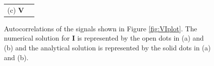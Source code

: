 {\begin{center}
\begin{figure}[h]
\begin{center}
\begin{tabular}{cc}
(c) $\mathbf{V}$
\end{tabular}
\end{center}
\caption[Autocorrelations of the signals]{Autocorrelations of the signals shown in Figure \ref{fig:VIplot}.  The numerical solution for $\mathbf{I}$ is represented by the open dots in (a) and (b) and the analytical solution is represented by the solid dots in (a) and (b).}
\label{fig:VIautocorr}
\end{figure}
\end{center}
\vspace*{\fill}
\clearpage
}
